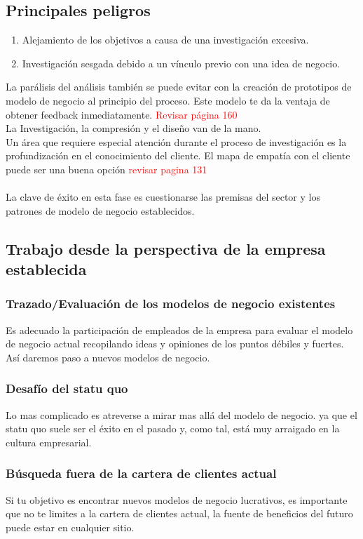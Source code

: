 \documentclass[11pt]{book}
\begin{document}
\subsection{Principales peligros}
\begin{enumerate}
\item Alejamiento de los objetivos a causa de una investigación excesiva.
\item Investigación sesgada debido a un vínculo previo con una idea de negocio.
\end{enumerate}

La parálisis del análisis también se puede evitar con la creación de prototipos de modelo de negocio al principio del proceso. Este modelo te da la ventaja de obtener feedback inmediatamente. \textcolor {red}{Revisar página 160} \\
 La Investigación, la compresión y el diseño van de la mano.\\
Un área que requiere especial atención durante el proceso de investigación es la profundización en el conocimiento del cliente. El mapa de empatía con el cliente puede ser una buena opción \textcolor {red}{revisar pagina 131}
\\\\
La clave de éxito en esta fase es cuestionarse las premisas del sector y los patrones de modelo de negocio establecidos.
\subsection{Trabajo desde la perspectiva de la empresa establecida}
\subsubsection{Trazado/Evaluación de los modelos de negocio existentes}
Es adecuado la participación de empleados de la empresa para evaluar el modelo de negocio actual recopilando ideas y opiniones de los puntos débiles y fuertes. Así daremos paso a nuevos modelos de negocio.
\subsubsection{Desafío del statu quo}
Lo mas complicado es atreverse a mirar mas allá del modelo de negocio. ya que el statu quo suele ser el éxito en el pasado y, como tal, está muy arraigado en la cultura empresarial.
\subsubsection{Búsqueda fuera de la cartera de clientes actual}
Si tu objetivo es encontrar nuevos modelos de negocio lucrativos, es importante que no te limites a la cartera de clientes actual, la fuente de beneficios del futuro puede estar en cualquier sitio.
\end{document}
